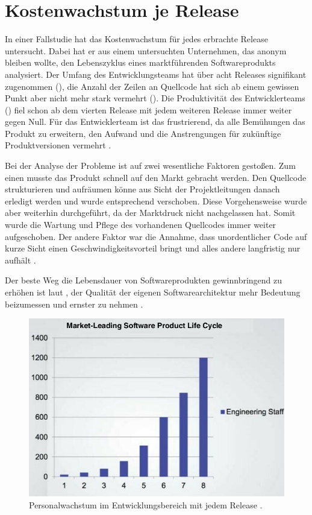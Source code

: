 \section{Kostenwachstum je Release}
\label{sec:Kostenwachstum}

In einer Fallstudie hat  das Kostenwachstum für jedes erbrachte Release untersucht. Dabei hat er aus einem untersuchten Unternehmen, das anonym bleiben wollte, den Lebenszyklus eines marktführenden Softwareprodukts analysiert. Der Umfang des Entwicklungsteams hat über acht Releases signifikant zugenommen (), die Anzahl der Zeilen an Quellcode hat sich ab einem gewissen Punkt aber nicht mehr stark vermehrt (). Die Produktivität des Entwicklerteams () fiel schon ab dem vierten Release mit jedem weiteren Release immer weiter gegen Null. Für das Entwicklerteam ist das frustrierend, da alle Bemühungen das Produkt zu erweitern, den Aufwand und die Anstrengungen für zukünftige Produktversionen vermehrt \citep[vgl.][5\psqq]{martin2018}. 

Bei der Analyse der Probleme ist  auf zwei wesentliche Faktoren gestoßen. Zum einen musste das Produkt schnell auf den Markt gebracht werden. Den Quellcode strukturieren und aufräumen könne aus Sicht der Projektleitungen danach erledigt werden und wurde entsprechend verschoben. Diese Vorgehensweise wurde aber weiterhin durchgeführt, da der Marktdruck nicht nachgelassen hat. Somit wurde die Wartung und Pflege des vorhandenen Quellcodes immer weiter aufgeschoben. Der andere Faktor war die Annahme, dass unordentlicher Code auf kurze Sicht einen Geschwindigkeitsvorteil bringt und alles andere langfristig nur aufhält \citep[vgl.][10]{martin2018}.

Der beste Weg die Lebensdauer von Softwareprodukten gewinnbringend zu erhöhen ist laut , der Qualität der eigenen Softwarearchitektur mehr Bedeutung beizumessen und ernster zu nehmen \citep[vgl.][12]{martin2018}.


\begin{figure}
  \centering
  \includegraphics[width=.6\textwidth]{res/staff_releases.jpg}
   \caption{Personalwachstum im Entwicklungsbereich mit jedem Release \citep[][5]{martin2018}.}
   \label{fig:staff_rel}
\end{figure}


